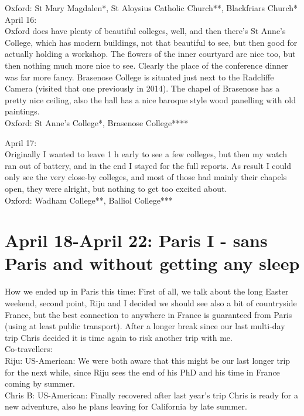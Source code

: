 Oxford: St Mary Magdalen*, St Aloysius Catholic Church**, Blackfriars Church*\\

April 16:\\
Oxford does have plenty of beautiful colleges, well, and then there's St Anne's College, which has modern buildings, not that beautiful to see, but then good for actually holding a workshop. The flowers of the inner courtyard are nice too, but then nothing much more nice to see. Clearly the place of the conference dinner was far more fancy. Brasenose College is situated just next to the Radcliffe Camera (visited that one previously in 2014). The chapel of Brasenose has a pretty nice ceiling, also the hall has a nice baroque style wood panelling with old paintings.\\

Oxford: St Anne's College*, Brasenose College****

April 17:\\
Originally I wanted to leave 1 h early to see a few colleges, but then my watch ran out of battery, and in the end I stayed for the full reports. As result I could only see the very close-by colleges, and most of those had mainly their chapels open, they were alright, but nothing to get too excited about.\\

Oxford: Wadham College**, Balliol College***

\section{April 18-April 22: Paris I - sans Paris and without getting any sleep}
\label{2019:Paris I}

How we ended up in Paris this time: First of all, we talk about the long Easter weekend, second point, Riju and I decided we should see also a bit of countryside France, but the best connection to anywhere in France is guaranteed from Paris (using at least public transport). After a longer break since our last multi-day trip Chris decided it is time again to risk another trip with me.\\

Co-travellers:\\
Riju: US-American: We were both aware that this might be our last longer trip for the next while, since Riju sees the end of his PhD and his time in France coming by summer.\\
Chris B: US-American: Finally recovered after last year's trip Chris is ready for a new adventure, also he plans leaving for California by late summer.\\

